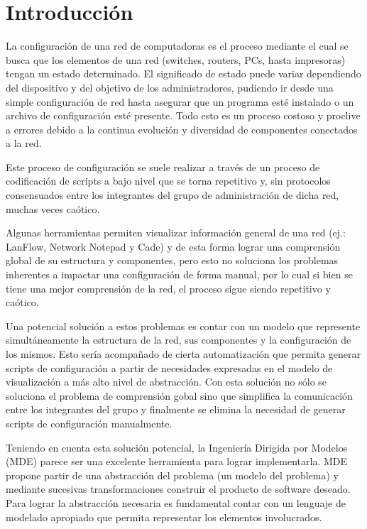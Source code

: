 \chapter{Introducción}

La configuración de una red de computadoras es el proceso mediante el cual se busca que los elementos de una red (switches, routers, PCs, hasta impresoras) tengan un estado determinado. El significado de estado puede variar dependiendo del dispositivo y del objetivo de los administradores, pudiendo ir desde una simple configuración de red hasta asegurar que un programa esté instalado o un archivo de configuración esté presente.
Todo esto es un proceso costoso y proclive a errores debido a la continua evolución y diversidad de componentes conectados a la red.

Este proceso de configuración se suele realizar a través de un proceso de codificación de scripts a bajo nivel que se torna repetitivo y, sin protocolos consensuados entre los integrantes del grupo de administración de dicha red, muchas veces caótico.

Algunas herramientas permiten visualizar información general de una red (ej.: LanFlow, Network Notepad y Cade) y de esta forma lograr una comprensión global de su estructura y componentes, pero esto no soluciona los problemas inherentes a impactar una configuración de forma manual, por lo cual si bien se tiene una mejor comprensión de la red, el proceso sigue siendo repetitivo y caótico.

Una potencial solución a estos problemas es contar con un modelo que represente simultáneamente la estructura de la red, sus componentes y la configuración de los mismos. Esto sería acompañado de cierta automatización que permita generar scripts de configuración a partir de necesidades expresadas en el modelo de visualización a más alto nivel de abstracción.
Con esta solución no sólo se soluciona el problema de comprensión gobal sino que simplifica la comunicación entre los integrantes del grupo y finalmente se elimina la necesidad de generar scripts de configuración manualmente.

Teniendo en cuenta esta solución potencial, la Ingeniería Dirigida por Modelos (MDE) parece ser una excelente herramienta para lograr implementarla. MDE propone partir de una abstracción del problema (un modelo del problema) y mediante sucesivas transformaciones construir el producto de software deseado. Para lograr la abstracción necesaria es fundamental contar con un lenguaje de modelado apropiado que permita representar los elementos involucrados.


